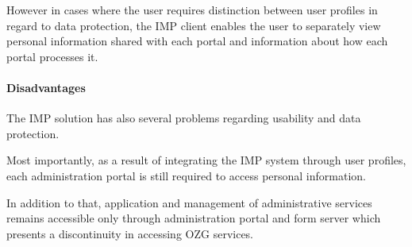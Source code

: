However in cases where the user requires distinction between user profiles in regard to data protection, the IMP client enables the user to separately view personal information shared with each portal and information about how each portal processes it.

\paragraph{Disadvantages}

The IMP solution has also several problems regarding usability and data protection.

Most importantly, as a result of integrating the IMP system through user profiles, each administration portal is still required to access personal information.

In addition to that, application and management of administrative services remains accessible only through administration portal and form server which presents a discontinuity in accessing OZG services.
